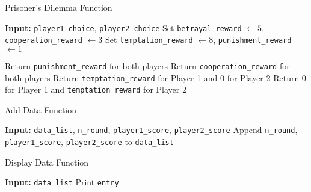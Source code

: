 \documentclass{article}
\begin{document}
\begin{algorithm}[H]
\caption{Prisoner's Dilemma Function}
\begin{algorithmic}[1]
\STATE \textbf{Input:} \texttt{player1\_choice}, \texttt{player2\_choice}
\STATE Set \texttt{betrayal\_reward} $\gets 5$, \texttt{cooperation\_reward} $\gets 3$
\STATE Set \texttt{temptation\_reward} $\gets 8$, \texttt{punishment\_reward} $\gets 1$

    \STATE Return \texttt{punishment\_reward} for both players
    \STATE Return \texttt{cooperation\_reward} for both players
    \STATE Return \texttt{temptation\_reward} for Player 1 and 0 for Player 2
    \STATE Return 0 for Player 1 and \texttt{temptation\_reward} for Player 2
\ENDIF
\end{algorithmic}
\end{algorithm}

\begin{algorithm}[H]
\caption{Add Data Function}
\begin{algorithmic}[1]
\STATE \textbf{Input:} \texttt{data\_list}, \texttt{n\_round}, \texttt{player1\_score}, \texttt{player2\_score}
\STATE Append \texttt{n\_round}, \texttt{player1\_score}, \texttt{player2\_score} to \texttt{data\_list}
\end{algorithmic}
\end{algorithm}

\begin{algorithm}[H]
\caption{Display Data Function}
\begin{algorithmic}[1]
\STATE \textbf{Input:} \texttt{data\_list}
    \STATE Print \texttt{entry}
\ENDFOR
\end{algorithmic}
\end{algorithm}
\end{document}
